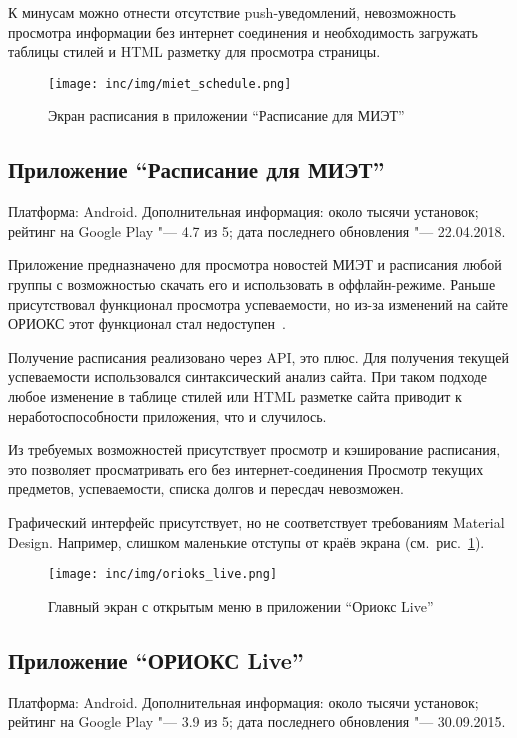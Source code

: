 К минусам можно отнести отсутствие push-уведомлений, невозможность просмотра информации без интернет соединения и необходимость загружать таблицы стилей и HTML разметку для просмотра страницы.

\begin{figure}[ht]
  \centering
  \texttt{[image: inc/img/miet\_schedule.png]}
  \caption{Экран расписания в приложении ``Расписание для МИЭТ''}
  \label{fig:mietSchedule}
\end{figure}

\subsection{Приложение ``Расписание для МИЭТ''}
\label{subsec:appMietSchedule}
Платформа: Android.
Дополнительная информация: около тысячи установок;
рейтинг на Google Play "--- 4.7 из 5;
дата последнего обновления "--- 22.04.2018.

Приложение предназначено для просмотра новостей МИЭТ и расписания любой группы с возможностью скачать его и использовать в оффлайн-режиме.
Раньше присутствовал функционал просмотра успеваемости, но из-за изменений на сайте ОРИОКС этот функционал стал недоступен~\cite{market:mietSchedule}.

Получение расписания реализовано через API, это плюс.
Для получения текущей успеваемости использовался синтаксический анализ сайта.
При таком подходе любое изменение в таблице стилей или HTML разметке сайта приводит к неработоспособности приложения, что и случилось.

Из требуемых возможностей присутствует просмотр и кэширование расписания, это позволяет просматривать его без интернет-соединения
Просмотр текущих предметов, успеваемости, списка долгов и пересдач невозможен.

Графический интерфейс присутствует, но не соответствует требованиям Material Design.
Например, слишком маленькие отступы от краёв экрана (см.~рис.~\ref{fig:mietSchedule}).

\begin{figure}[ht]
  \centering
  \texttt{[image: inc/img/orioks\_live.png]}
  \caption{Главный экран с открытым меню в приложении ``Ориокс Live''}
  \label{fig:orioksLive}
\end{figure}

\subsection{Приложение ``ОРИОКС Live''}
\label{subsec:appOrioksLive}
Платформа: Android.
Дополнительная информация: около тысячи установок;
рейтинг на Google Play "--- 3.9 из 5;
дата последнего обновления "--- 30.09.2015.

